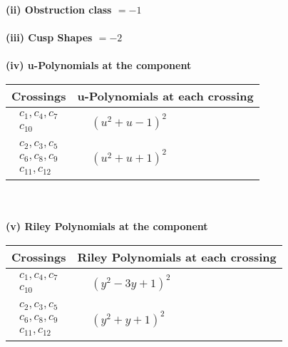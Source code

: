 \documentclass[1p]{elsarticle_modified}
\theoremstyle{definition}
\begin{document}
\flushleft \textbf{(ii) Obstruction class $= -1$}\\~\\
\flushleft \textbf{(iii) Cusp Shapes $= -2$}\\~\\
\newpage\renewcommand{\arraystretch}{1}
\flushleft \textbf{(iv) u-Polynomials at the component}\newline \\
\begin{tabular}{m{50pt}|m{274pt}}
Crossings & \hspace{64pt}u-Polynomials at each crossing \\
\hline $$\begin{aligned}c_{1},c_{4},c_{7}\\c_{10}\end{aligned}$$&$\begin{aligned}
&(u^2+u-1)^2
\end{aligned}$\\
\hline $$\begin{aligned}c_{2},c_{3},c_{5}\\c_{6},c_{8},c_{9}\\c_{11},c_{12}\end{aligned}$$&$\begin{aligned}
&(u^2+u+1)^2
\end{aligned}$\\
\hline
\end{tabular}\\~\\
\newpage\renewcommand{\arraystretch}{1}
\flushleft \textbf{(v) Riley Polynomials at the component}\newline \\
\begin{tabular}{m{50pt}|m{274pt}}
Crossings & \hspace{64pt}Riley Polynomials at each crossing \\
\hline $$\begin{aligned}c_{1},c_{4},c_{7}\\c_{10}\end{aligned}$$&$\begin{aligned}
&(y^2-3 y+1)^2
\end{aligned}$\\
\hline $$\begin{aligned}c_{2},c_{3},c_{5}\\c_{6},c_{8},c_{9}\\c_{11},c_{12}\end{aligned}$$&$\begin{aligned}
&(y^2+y+1)^2
\end{aligned}$\\
\hline
\end{tabular}\\~\\
\end{document}

